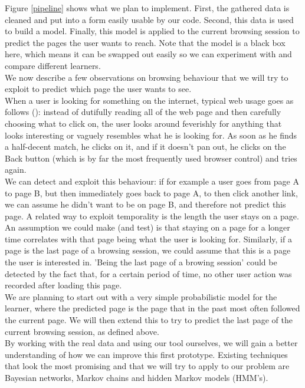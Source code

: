 \documentclass[a4paper,11pt]{article}
\begin{document}
Figure \ref{pipeline} shows what we plan to implement. First, the gathered data is cleaned and put into a form easily usable by our code. Second, this data is used to build a model. Finally, this model is applied to the current browsing session to predict the pages the user wants to reach. Note that the model is a black box here, which means it can be swapped out easily so we can experiment with and compare different learners.\\[8pt]

We now describe a few observations on browsing behaviour that we will try to exploit to predict which page the user wants to see.\\[8pt]

When a user is looking for something on the internet, typical web usage goes as follows (\cite{krug}): instead of dutifully reading all of the web page and then carefully choosing what to click on, the user looks around feverishly for anything that looks interesting or vaguely resembles what he is looking for. As soon as he finds a half-decent match, he clicks on it, and if it doesn't pan out, he clicks on the Back button (which is by far the most frequently used browser control) and tries again.\\[8pt]

We can detect and exploit this behaviour: if for example a user goes from page A to page B, but then immediately goes back to page A, to then click another link, we can assume he didn't want to be on page B, and therefore not predict this page. A related way to exploit temporality is the length the user stays on a page. An assumption we could make (and test) is that staying on a page for a longer time correlates with that page being what the user is looking for. Similarly, if a page is the last page of a browsing session, we could assume that this is a page the user is interested in. 'Being the last page of a browing session' could be detected by the fact that, for a certain period of time, no other user action was recorded after loading this page.\\[8pt]

We are planning to start out with a very simple probabilistic model for the learner, where the predicted page is the page that in the past most often followed the current page. We will then extend this to try to predict the last page of the current browsing session, as defined above.\\[8pt]

By working with the real data and using our tool ourselves, we will gain a better understanding of how we can improve this first prototype. Existing techniques that look the most promising and that we will try to apply to our problem are Bayesian networks, Markov chains and hidden Markov models (HMM's).\\[8pt]
\end{document}
